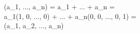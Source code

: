 (a_1, ..., a_n) = a_1 + ... + a_n = \\
a_1(1, 0, ..., 0) + ... + a_n(0, 0, ..., 0, 1) = \\
(a_1, a_2, ..., a_n)